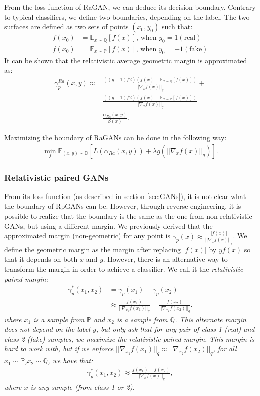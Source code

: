\documentclass{article}
\begin{document}
From the loss function of RaGAN, we can deduce its decision boundary.
Contrary to typical classifiers, we define two boundaries, depending on the label.
The two surfaces are defined as two sets of points $(x_0,y_0)$ such that:
\begin{align*}
f(x_0) &= \mathbb{E}_{x \sim \mathbb{Q}}[f(x)] \text{, when } y_0 = 1 (\text{real}) \\
f(x_0) &= \mathbb{E}_{x \sim \mathbb{P}}[f(x)] \text{, when } y_0 = -1 (\text{fake})
\end{align*}
It can be shown that the relativistic average geometric margin is approximated as:
\begin{align*}
\gamma_p^{Ra}(x,y) \approx &\frac{((y+1)/2)(f(x)-\mathbb{E}_{x \sim \mathbb{Q}}[f(x)])}{|| \nabla_x f(x) ||_q} + \\ &\frac{ ((y-1)/2)(f(x)-\mathbb{E}_{x \sim \mathbb{P}}[f(x)])}{|| \nabla_x f(x) ||_q} \\ = &\frac{\alpha_{Ra}(x,y)}{\beta(x)}.
\end{align*}

Maximizing the boundary of RaGANs can be done in the following way:
\begin{align*}
\min_f \mathbb{E}_{(x,y)\sim \mathbb{D}}\left[L(\alpha_{Ra}(x,y)) + \lambda g(||\nabla_x f(x)||_q)\right].
\end{align*}

\subsubsection{Relativistic paired GANs}

From its loss function (as described in section \ref{sec:GANs}), it is not clear what the boundary of RpGANs can be. However, through reverse engineering, it is possible to realize that the boundary is the same as the one from non-relativistic GANs, but using a different margin. We previously derived that the approximated margin (non-geometric) for any point is $\gamma_p(x) \approx \frac{|f(x)|}{|| \nabla_x f(x) ||_q}$. We define the geometric margin as the margin after replacing $|f(x)|$ by $yf(x)$ so that it depends on both $x$ and $y$. However, there is an alternative way to transform the margin in order to achieve a classifier. We call it the \em relativistic paired margin\em:
\begin{align*}
\gamma^{*}_p(x_1,x_2) &= \gamma_p(x_1) - \gamma_p(x_2) \\
& \approx \frac{f(x_1)}{|| \nabla_{x_1} f(x_1) ||_q} - \frac{f(x_2)}{|| \nabla_{x_2} f(x_2) ||_q}.
\end{align*}
where $x_1$ is a sample from $\mathbb{P}$ and $x_2$ is a sample from $\mathbb{Q}$. This alternate margin does not depend on the label $y$, but only ask that for any pair of class 1 (real) and class 2 (fake) samples, we maximize the relativistic paired margin. This margin is hard to work with, but if we enforce $|| \nabla_{x_1} f(x_1) ||_q \approx || \nabla_{x_2} f(x_2) ||_q$, for all $x_1 \sim \mathbb{P}$,$x_2 \sim \mathbb{Q}$, we have that:
\begin{align*}
\gamma^{*}_p(x_1,x_2) \approx \frac{f(x_1) - f(x_2)}{|| \nabla_{x} f(x) ||_q},
\end{align*}
where $x$ is any sample (from class 1 or 2).
\end{document}
